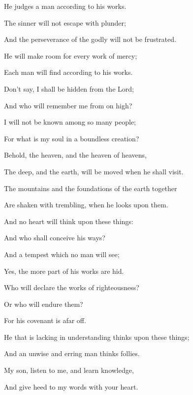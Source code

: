 {\par }{\Q He judges a man according to his works.
\par }{\Q {}The sinner will not escape with
{} plunder;
\par }{\Q And the perseverance of the godly will not be frustrated.
\par }{\Q {}He will make room for every work of mercy;
\par }{\Q Each man will find according to his works.
\par }{\BB \par }{\Q {}Don’t say, I shall be hidden from the Lord;
\par }{\Q And who will remember me from on high?
\par }{\Q I will not be known among so many people;
\par }{\Q For what is my soul in a boundless creation?
\par }{\Q {}Behold, the heaven, and the heaven of heavens,
\par }{\Q The deep, and the earth, will be moved when he shall visit.
\par }{\Q {}The mountains and the foundations of the earth together
\par }{\Q Are shaken with trembling, when he looks upon them.
\par }{\Q {}And no heart will think upon these things:
\par }{\Q And who shall conceive his ways?
\par }{\Q {}And
{} a tempest which no man will see;
\par }{\Q Yes, the more part of his works are
 hid.
\par }{\Q {}Who will declare the works of
{} righteousness?
\par }{\Q Or who will endure them?
\par }{\Q For his covenant is afar off.
\par }{\Q {}He that is lacking in
 understanding thinks upon these things;
\par }{\Q And an unwise and erring man thinks follies.
\par }{\Q {}My son, listen to me, and learn knowledge,
\par }{\Q And give heed to my words with your heart.
}

